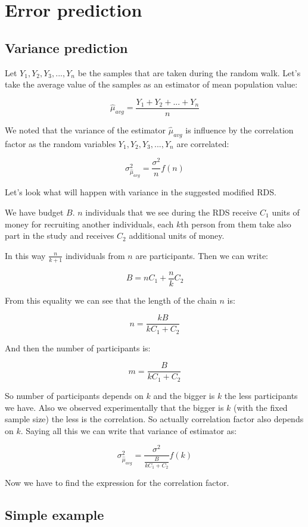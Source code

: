 \documentclass[12pt]{report}
\begin{document}
\section{Error prediction}

\subsection{Variance prediction}

Let $Y_1, Y_2, Y_3,..., Y_n$ be the samples that are taken during the random walk. Let's take the average value of the samples as an estimator of mean population value:

$$ \widehat{\mu}_{avg} = \frac{Y_1 + Y_2 + ... + Y_n}{n}$$

We noted that the variance of the estimator $\widehat{\mu}_{avg}$ is influence by the correlation factor as the random variables $Y_1, Y_2, Y_3,..., Y_n$ are correlated:

$$ \sigma^2_{\hat{\mu}_{avg}} = \frac{\sigma^2}{n} f(n)$$

Let's look what will happen with variance in the suggested modified RDS.

We have budget $B$. $n$ individuals that we see during the RDS receive $C_1$ units of money for recruiting another individuals, each $k$th person from them take also part in the study and receives $C_2$ additional units of money. 

In this way $\frac{n}{k+1}$ individuals from $n$ are participants. Then we can write:

$$B = nC_1 + \frac{n}{k}C_2$$

From this equality we can see that the length of the chain $n$ is:

$$n = \frac{kB}{kC_1 + C_2}$$

And then the number of participants is:

$$m = \frac{B}{kC_1 + C_2}$$

So number of participants depends on $k$ and the bigger is $k$ the less participants we have.
Also we observed experimentally that the bigger is $k$ (with the fixed sample size) the less is the correlation. So actually correlation factor also depends on $k$.
Saying all this we can write that variance of estimator as:

$$ \sigma^2_{\hat{\mu}_{avg}} = \frac{\sigma^2}{\frac{B}{kC_1 + C_2}} f(k)$$

Now we have to find the expression for the correlation factor.

\subsection{Simple example}
\end{document}
